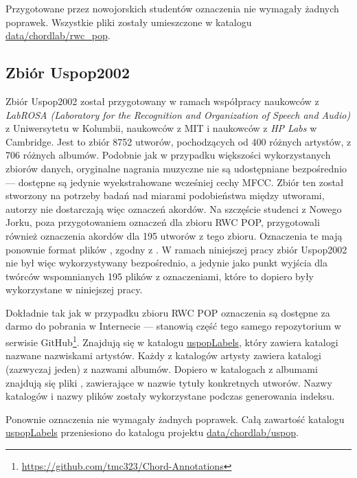 Przygotowane przez nowojorskich studentów oznaczenia nie wymagały żadnych poprawek. Wszystkie pliki  zostały umieszczone w katalogu \url{data/chordlab/rwc_pop}.

\subsection{Zbiór Uspop2002}

Zbiór Uspop2002 \cite{berenzweig_large-scale_2004} został przygotowany w ramach współpracy naukowców z \emph{LabROSA (Laboratory for the Recognition and Organization of Speech and Audio)} z Uniwersytetu w Kolumbii, naukowców z MIT i naukowców z \emph{HP Labs} w Cambridge. Jest to zbiór 8752 utworów, pochodzących od 400 różnych artystów, z 706 różnych albumów. Podobnie jak w przypadku większości wykorzystanych zbiorów danych, oryginalne nagrania muzyczne nie są udostępniane bezpośrednio --- dostępne są jedynie wyekstrahowane wcześniej cechy MFCC. Zbiór ten został stworzony na potrzeby badań nad miarami podobieństwa między utworami, autorzy nie dostarczają więc oznaczeń akordów. Na szczęście studenci z Nowego Jorku, poza przygotowaniem oznaczeń dla zbioru RWC POP, przygotowali również oznaczenia akordów dla 195 utworów z tego zbioru. Oznaczenia te mają ponownie format plików , zgodny z \cite{harte_towards_nodate}. W ramach niniejszej pracy zbiór Uspop2002 nie był więc wykorzystywany bezpośrednio, a jedynie jako punkt wyjścia dla twórców wspomnianych 195 plików z oznaczeniami, które to dopiero były wykorzystane w niniejszej pracy.

Dokładnie tak jak w przypadku zbioru RWC POP oznaczenia są dostępne za darmo do pobrania w Internecie --- stanowią część tego samego repozytorium w serwisie GitHub\footnote{\url{https://github.com/tmc323/Chord-Annotations}}. Znajdują się w katalogu \url{uspopLabels}, który zawiera katalogi nazwane nazwiskami artystów. Każdy z katalogów artysty zawiera katalogi (zazwyczaj jeden) z nazwami albumów. Dopiero w katalogach z albumami znajdują się pliki , zawierające w nazwie tytuły konkretnych utworów. Nazwy katalogów i nazwy plików zostały wykorzystane podczas generowania indeksu.

Ponownie oznaczenia nie wymagały żadnych poprawek. Całą zawartość katalogu \url{uspopLabels} przeniesiono do katalogu projektu \url{data/chordlab/uspop}.


